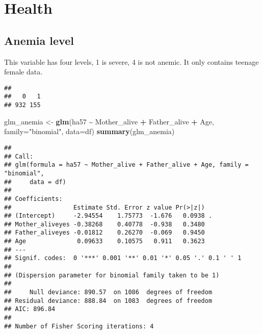 \documentclass[
]{article}
\newenvironment{Shaded}{\begin{snugshade}}{\end{snugshade}}
\newcommand{\AttributeTok}[1]{\textcolor[rgb]{0.13,0.29,0.53}{#1}}
\newcommand{\FunctionTok}[1]{\textcolor[rgb]{0.13,0.29,0.53}{\textbf{#1}}}
\newcommand{\NormalTok}[1]{#1}
\newcommand{\OtherTok}[1]{\textcolor[rgb]{0.56,0.35,0.01}{#1}}
\newcommand{\SpecialCharTok}[1]{\textcolor[rgb]{0.81,0.36,0.00}{\textbf{#1}}}
\newcommand{\StringTok}[1]{\textcolor[rgb]{0.31,0.60,0.02}{#1}}
\begin{document}
\hypertarget{health}{%
\section{Health}\label{health}}

\hypertarget{anemia-level}{%
\subsection{Anemia level}\label{anemia-level}}

This variable has four levels, 1 is severe, 4 is not anemic. It only
contains teenage female data.

\begin{Shaded}
\end{Shaded}

\begin{verbatim}
## 
##   0   1 
## 932 155
\end{verbatim}

\begin{Shaded}
\begin{Highlighting}[]
\NormalTok{glm\_anemia }\OtherTok{\textless{}{-}} \FunctionTok{glm}\NormalTok{(ha57 }\SpecialCharTok{\textasciitilde{}}\NormalTok{ Mother\_alive }\SpecialCharTok{+}\NormalTok{ Father\_alive }\SpecialCharTok{+}\NormalTok{ Age,}
                  \AttributeTok{family=}\StringTok{"binomial"}\NormalTok{, }\AttributeTok{data=}\NormalTok{df)}
\FunctionTok{summary}\NormalTok{(glm\_anemia)}
\end{Highlighting}
\end{Shaded}

\begin{verbatim}
## 
## Call:
## glm(formula = ha57 ~ Mother_alive + Father_alive + Age, family = "binomial", 
##     data = df)
## 
## Coefficients:
##                 Estimate Std. Error z value Pr(>|z|)  
## (Intercept)     -2.94554    1.75773  -1.676   0.0938 .
## Mother_aliveyes -0.38268    0.40778  -0.938   0.3480  
## Father_aliveyes -0.01812    0.26270  -0.069   0.9450  
## Age              0.09633    0.10575   0.911   0.3623  
## ---
## Signif. codes:  0 '***' 0.001 '**' 0.01 '*' 0.05 '.' 0.1 ' ' 1
## 
## (Dispersion parameter for binomial family taken to be 1)
## 
##     Null deviance: 890.57  on 1086  degrees of freedom
## Residual deviance: 888.84  on 1083  degrees of freedom
## AIC: 896.84
## 
## Number of Fisher Scoring iterations: 4
\end{verbatim}
\end{document}
